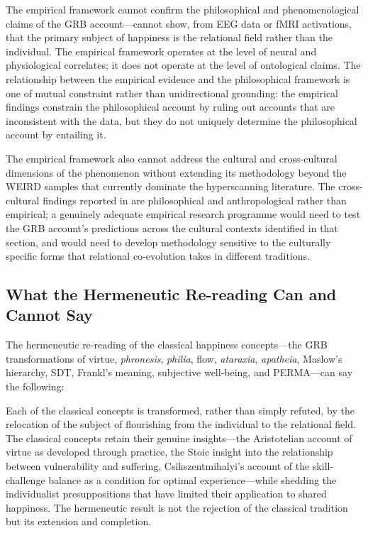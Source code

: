 The empirical framework cannot confirm the philosophical and phenomenological claims of the GRB account---cannot show, from EEG data or fMRI activations, that the primary subject of happiness is the relational field rather than the individual. The empirical framework operates at the level of neural and physiological correlates; it does not operate at the level of ontological claims. The relationship between the empirical evidence and the philosophical framework is one of mutual constraint rather than unidirectional grounding: the empirical findings constrain the philosophical account by ruling out accounts that are inconsistent with the data, but they do not uniquely determine the philosophical account by entailing it.

The empirical framework also cannot address the cultural and cross-cultural dimensions of the phenomenon without extending its methodology beyond the WEIRD samples that currently dominate the hyperscanning literature. The cross-cultural findings reported in  are philosophical and anthropological rather than empirical; a genuinely adequate empirical research programme would need to test the GRB account's predictions across the cultural contexts identified in that section, and would need to develop methodology sensitive to the culturally specific forms that relational co-evolution takes in different traditions.

\subsection{What the Hermeneutic Re-reading Can and Cannot Say}
\label{p14:subsec:conc_herm}

\noindent
The hermeneutic re-reading of the classical happiness concepts---the GRB transformations of virtue, \emph{phronesis}, \emph{philia}, flow, \emph{ataraxia}, \emph{apatheia}, Maslow's hierarchy, SDT, Frankl's meaning, subjective well-being, and PERMA---can say the following:

Each of the classical concepts is transformed, rather than simply refuted, by the relocation of the subject of flourishing from the individual to the relational field. The classical concepts retain their genuine insights---the Aristotelian account of virtue as developed through practice, the Stoic insight into the relationship between vulnerability and suffering, Csikszentmihalyi's account of the skill-challenge balance as a condition for optimal experience---while shedding the individualist presuppositions that have limited their application to shared happiness. The hermeneutic result is not the rejection of the classical tradition but its extension and completion.

